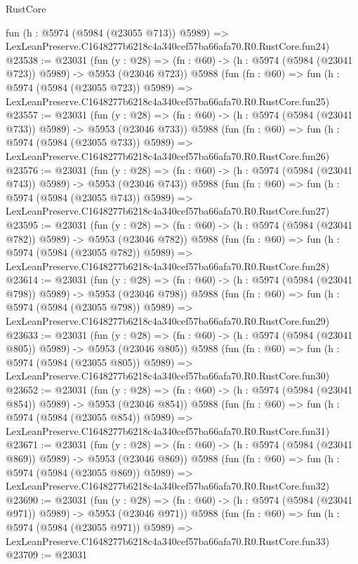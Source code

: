 \begin{lexlean}{RustCore}
\begin{coremodule}
    fun (h : @5974 (@5984 (@23055 @713)) @5989) =>
    LexLeanPreserve.C1648277b6218c4a340cef57ba66afa70.R0.RustCore.fun24)
@23538 := @23031
    (fun (y : @28) => (fn : @60) -> (h : @5974 (@5984 (@23041 @723)) @5989) -> @5953 (@23046 @723))
    @5988
    (fun (fn : @60) =>
    fun (h : @5974 (@5984 (@23055 @723)) @5989) =>
    LexLeanPreserve.C1648277b6218c4a340cef57ba66afa70.R0.RustCore.fun25)
@23557 := @23031
    (fun (y : @28) => (fn : @60) -> (h : @5974 (@5984 (@23041 @733)) @5989) -> @5953 (@23046 @733))
    @5988
    (fun (fn : @60) =>
    fun (h : @5974 (@5984 (@23055 @733)) @5989) =>
    LexLeanPreserve.C1648277b6218c4a340cef57ba66afa70.R0.RustCore.fun26)
@23576 := @23031
    (fun (y : @28) => (fn : @60) -> (h : @5974 (@5984 (@23041 @743)) @5989) -> @5953 (@23046 @743))
    @5988
    (fun (fn : @60) =>
    fun (h : @5974 (@5984 (@23055 @743)) @5989) =>
    LexLeanPreserve.C1648277b6218c4a340cef57ba66afa70.R0.RustCore.fun27)
@23595 := @23031
    (fun (y : @28) => (fn : @60) -> (h : @5974 (@5984 (@23041 @782)) @5989) -> @5953 (@23046 @782))
    @5988
    (fun (fn : @60) =>
    fun (h : @5974 (@5984 (@23055 @782)) @5989) =>
    LexLeanPreserve.C1648277b6218c4a340cef57ba66afa70.R0.RustCore.fun28)
@23614 := @23031
    (fun (y : @28) => (fn : @60) -> (h : @5974 (@5984 (@23041 @798)) @5989) -> @5953 (@23046 @798))
    @5988
    (fun (fn : @60) =>
    fun (h : @5974 (@5984 (@23055 @798)) @5989) =>
    LexLeanPreserve.C1648277b6218c4a340cef57ba66afa70.R0.RustCore.fun29)
@23633 := @23031
    (fun (y : @28) => (fn : @60) -> (h : @5974 (@5984 (@23041 @805)) @5989) -> @5953 (@23046 @805))
    @5988
    (fun (fn : @60) =>
    fun (h : @5974 (@5984 (@23055 @805)) @5989) =>
    LexLeanPreserve.C1648277b6218c4a340cef57ba66afa70.R0.RustCore.fun30)
@23652 := @23031
    (fun (y : @28) => (fn : @60) -> (h : @5974 (@5984 (@23041 @854)) @5989) -> @5953 (@23046 @854))
    @5988
    (fun (fn : @60) =>
    fun (h : @5974 (@5984 (@23055 @854)) @5989) =>
    LexLeanPreserve.C1648277b6218c4a340cef57ba66afa70.R0.RustCore.fun31)
@23671 := @23031
    (fun (y : @28) => (fn : @60) -> (h : @5974 (@5984 (@23041 @869)) @5989) -> @5953 (@23046 @869))
    @5988
    (fun (fn : @60) =>
    fun (h : @5974 (@5984 (@23055 @869)) @5989) =>
    LexLeanPreserve.C1648277b6218c4a340cef57ba66afa70.R0.RustCore.fun32)
@23690 := @23031
    (fun (y : @28) => (fn : @60) -> (h : @5974 (@5984 (@23041 @971)) @5989) -> @5953 (@23046 @971))
    @5988
    (fun (fn : @60) =>
    fun (h : @5974 (@5984 (@23055 @971)) @5989) =>
    LexLeanPreserve.C1648277b6218c4a340cef57ba66afa70.R0.RustCore.fun33)
@23709 := @23031

\end{coremodule}
\end{lexlean}

